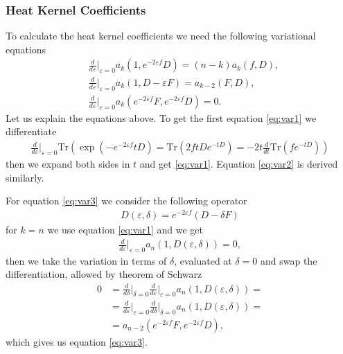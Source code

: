 \subsubsection{Heat Kernel Coefficients}
To calculate the heat kernel coefficients we need the following variational
equations
\begin{align}
    &\frac{d}{d\varepsilon}\bigg|_{\varepsilon=0}a_k(1, e^{-2\varepsilon f}D) =
    (n-k) a_k(f, D),\label{eq:var1}\\
    &\frac{d}{d\varepsilon}\bigg|_{\varepsilon=0}a_k(1, D-\varepsilon F) =
    a_{k-2}(F,D),\label{eq:var2}\\
    &\frac{d}{d\varepsilon}\bigg|_{\varepsilon=0}a_k(e^{-2\varepsilon f}F,
    e^{-2\varepsilon f}D) =
    0\label{eq:var3}.
\end{align}
Let us explain the equations above. To get the first equation \eqref{eq:var1}
we differentiate \begin{align}
    \frac{d}{d\varepsilon}\bigg|_{\varepsilon=0} \text{Tr}(\exp(-e^{-2\varepsilon
    f}tD) = \text{Tr}(2ftDe^{-tD}) = -2t\frac{d}{dt}\text{Tr}(fe^{-tD}))
\end{align}
then we expand both sides in $t$ and get \eqref{eq:var1}. Equation \eqref{eq:var2} is derived similarly.

For equation \eqref{eq:var3} we consider the following operator
\begin{align}
    D(\varepsilon,\delta) = e^{-2\varepsilon f}(D-\delta F)
\end{align}
for $k=n$ we use equation \eqref{eq:var1} and we get
\begin{align}
    \frac{d}{d\varepsilon}\bigg|_{\varepsilon=0}a_n(1,D(\varepsilon,\delta))
    =0,
\end{align}
then we take the variation in terms of $\delta$, evaluated at $\delta =0$ and
swap the differentiation, allowed by theorem of Schwarz
\begin{align}
    0 &=
    \frac{d}{d\delta}\bigg|_{\delta=0}\frac{d}{d\varepsilon}\bigg|_{\varepsilon=0}a_n(1,
    D(\varepsilon,\delta)) =\nonumber\\
      &=\frac{d}{d\varepsilon}\bigg|_{\varepsilon=0}\frac{d}{d\delta}\bigg|_{\delta=0}a_n(1,
    D(\varepsilon,\delta)) =\nonumber\\
      &=a_{n-2} ( e^{-2\varepsilon f}F, e^{-2\varepsilon f}D),
\end{align}
which gives us equation \eqref{eq:var3}.

